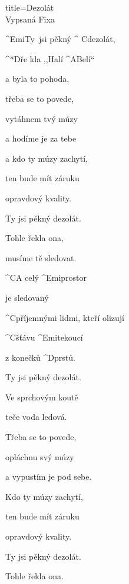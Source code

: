 \begin{song}{title=\predtitle\centering Dezolát\\\large Vypsaná Fixa \vspace*{-0.3cm}}  %
\begin{centerjustified}
\nejvetsi

\begin{varwidth}[t]{0.48\textwidth}\setlength{\parindent}{0.45cm}  %

\sloka
	^{Emi\z}Ty~jsi pěkný ^{\,\,C}dezolát,
	
	^*{D}ře kla ,,Halí ^{A}Belí`` 
	
	a byla to pohoda,
	
	třeba se to povede, 
	
	vytáhnem tvý múzy 
	
	a hodíme je za tebe 
	
	a kdo ty múzy zachytí, 

	ten bude mít záruku 
	
	opravdový kvality.
	
	Ty jsi pěkný dezolát.
	
	Tohle řekla ona, 
	
	musíme tě sledovat.
	
	^{C}A celý ^{Emi}prostor 
	
	je sledovaný
	
	^{C}příjemnými lidmi, kteří olizují 
	
	^{C}šťávu ^{Emi}tekoucí 
	
	z konečků ^{D}prstů.
	
\sloka
	Ty jsi pěkný dezolát.
	
	Ve sprchovým koutě 
	
	teče voda ledová.
	
	Třeba se to povede,
	
	opláchnu svý múzy 
	
	a vypustím je pod sebe. 
	
	Kdo ty múzy zachytí, 
	
	ten bude mít záruku 
	
	opravdový kvality. 
	
	Ty jsi pěkný dezolát. 
	
	Tohle řekla ona.
	
	
\end{varwidth}\mezisloupci\begin{varwidth}[t]{0.48\textwidth}\setlength{\parindent}{0.45cm}%


\end{varwidth}
\end{centerjustified}
\end{song}
